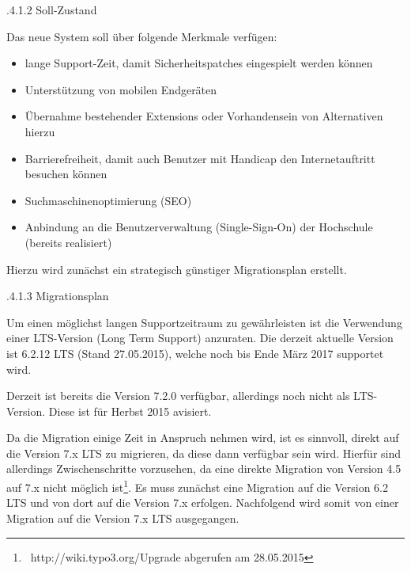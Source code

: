 \documentclass[a4paper]{article}
\newcommand\liststyleWWviiiNumvi{%
\renewcommand\labelitemi{{\textbullet}}
\renewcommand\labelitemii{o}
\renewcommand\labelitemiii{${\blacksquare}$}
\renewcommand\labelitemiv{{\textbullet}}
}
\begin{document}
\bigskip

{.4.1.2 Soll-Zustand}


\bigskip

{\sffamily
Das neue System soll über folgende Merkmale verfügen:}


\bigskip

\liststyleWWviiiNumvi
\begin{itemize}
\item {\sffamily
lange Support-Zeit, damit Sicherheitspatches eingespielt werden können}
\item {\sffamily
Unterstützung von mobilen Endgeräten}
\item {\sffamily
Übernahme bestehender Extensions oder Vorhandensein von Alternativen hierzu}
\item {\sffamily
Barrierefreiheit, damit auch Benutzer mit Handicap den Internetauftritt besuchen können}
\item {\sffamily
Suchmaschinenoptimierung (SEO)}
\item {\sffamily
Anbindung an die Benutzerverwaltung (Single-Sign-On) der Hochschule (bereits realisiert)}
\end{itemize}

\bigskip

{\sffamily
Hierzu wird zunächst ein strategisch günstiger Migrationsplan erstellt.}


\bigskip

{.4.1.3 Migrationsplan}


\bigskip

{\sffamily
Um einen möglichst langen Supportzeitraum zu gewährleisten ist die Verwendung einer LTS-Version (Long Term Support)
anzuraten. Die derzeit aktuelle Version ist 6.2.12 LTS (Stand 27.05.2015), welche noch bis Ende März 2017 supportet
wird.}


\bigskip

{\sffamily
Derzeit ist bereits die Version 7.2.0 verfügbar, allerdings noch nicht als LTS-Version. Diese ist für Herbst 2015
avisiert. }


\bigskip

{\sffamily
Da die Migration einige Zeit in Anspruch nehmen wird, ist es sinnvoll, direkt auf die Version 7.x LTS zu migrieren, da
diese dann verfügbar sein wird. Hierfür sind allerdings Zwischenschritte vorzusehen, da eine direkte Migration von
Version 4.5 auf 7.x nicht möglich ist\footnote{\ http://wiki.typo3.org/Upgrade abgerufen am 28.05.2015}. Es muss
zunächst eine Migration auf die Version 6.2 LTS und von dort auf die Version 7.x erfolgen. Nachfolgend wird somit von
einer Migration auf die Version 7.x LTS ausgegangen.}
\end{document}
